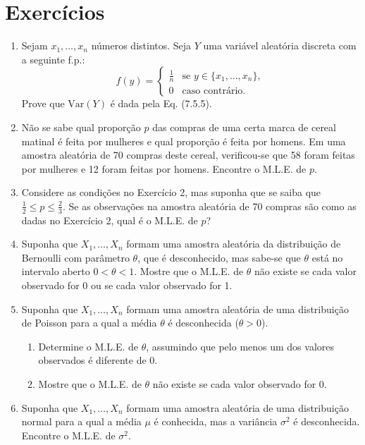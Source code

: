 \section*{Exercícios}
\begin{enumerate}
    \item Sejam $x_1, \dots, x_n$ números distintos. Seja $Y$ uma variável aleatória discreta com a seguinte f.p.:
    $$ f(y) = \begin{cases} \frac{1}{n} & \text{se } y \in \{x_1, \dots, x_n\}, \\ 0 & \text{caso contrário}. \end{cases} $$
    Prove que $\text{Var}(Y)$ é dada pela Eq. (7.5.5).

    \item Não se sabe qual proporção $p$ das compras de uma certa marca de cereal matinal é feita por mulheres e qual proporção é feita por homens. Em uma amostra aleatória de 70 compras deste cereal, verificou-se que 58 foram feitas por mulheres e 12 foram feitas por homens. Encontre o M.L.E. de $p$.

    \item Considere as condições no Exercício 2, mas suponha que se saiba que $\frac{1}{2} \le p \le \frac{2}{3}$. Se as observações na amostra aleatória de 70 compras são como as dadas no Exercício 2, qual é o M.L.E. de $p$?

    \item Suponha que $X_1, \dots, X_n$ formam uma amostra aleatória da distribuição de Bernoulli com parâmetro $\theta$, que é desconhecido, mas sabe-se que $\theta$ está no intervalo aberto $0 < \theta < 1$. Mostre que o M.L.E. de $\theta$ não existe se cada valor observado for 0 ou se cada valor observado for 1.

    \item Suponha que $X_1, \dots, X_n$ formam uma amostra aleatória de uma distribuição de Poisson para a qual a média $\theta$ é desconhecida ($\theta > 0$).
    \begin{enumerate}
        \item Determine o M.L.E. de $\theta$, assumindo que pelo menos um dos valores observados é diferente de 0.
        \item Mostre que o M.L.E. de $\theta$ não existe se cada valor observado for 0.
    \end{enumerate}

    \item Suponha que $X_1, \dots, X_n$ formam uma amostra aleatória de uma distribuição normal para a qual a média $\mu$ é conhecida, mas a variância $\sigma^2$ é desconhecida. Encontre o M.L.E. de $\sigma^2$.


\end{enumerate}
